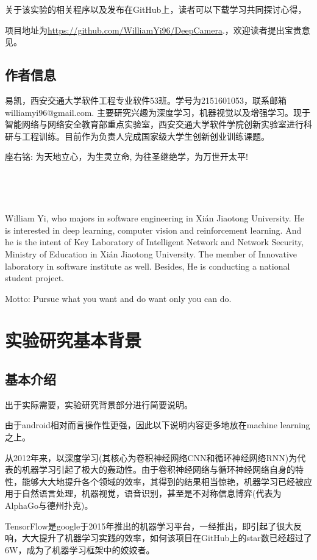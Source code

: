 \documentclass[UTF8, Microsoft YaHei]{book}
\begin{document}
    关于该实验的相关程序以及发布在GitHub上，读者可以下载学习共同探讨心得，

    项目地址为\url{https://github.com/WilliamYi96/DeepCamera}.，欢迎读者提出宝贵意见。
    \newpage

    \section{作者信息}

    易凯，西安交通大学软件工程专业软件53班。学号为2151601053，联系邮箱williamyi96@gmail.com. 主要研究兴趣为深度学习，机器视觉以及增强学习。现于智能网络与网络安全教育部重点实验室，西安交通大学软件学院创新实验室进行科研与工程训练。目前作为负责人完成国家级大学生创新创业训练课题。


    座右铭: 为天地立心，为生灵立命, 为往圣继绝学，为万世开太平!

    ~

    ~

    William Yi, who majors in software engineering in Xi\'an Jiaotong University. He is interested in deep learning, computer vision and reinforcement learning. And he is the intent of Key Laboratory of Intelligent Network and Network Security, Ministry of Education in Xi\'an Jiaotong University. The member of Innovative laboratory in software institute as well. Besides, He is conducting a national student project.

    Motto: Pursue what you want and do want only you can do.

    \chapter{实验研究基本背景}
    \section{基本介绍}
    出于实际需要，实验研究背景部分进行简要说明。

    由于android相对而言操作性更强，因此以下说明内容更多地放在machine learning之上。

    从2012年来，以深度学习(其核心为卷积神经网络CNN和循环神经网络RNN)为代表的机器学习引起了极大的轰动性。由于卷积神经网络与循环神经网络自身的特性，能够大大地提升各个领域的效率，其得到的结果相当惊艳，机器学习已经被应用于自然语言处理，机器视觉，语音识别，甚至是不对称信息博弈(代表为AlphaGo与德州扑克)。

    TensorFlow是google于2015年推出的机器学习平台，一经推出，即引起了很大反响，大大提升了机器学习实践的效率，如何该项目在GitHub上的star数已经超过了6W，成为了机器学习框架中的姣姣者。
\end{document}
